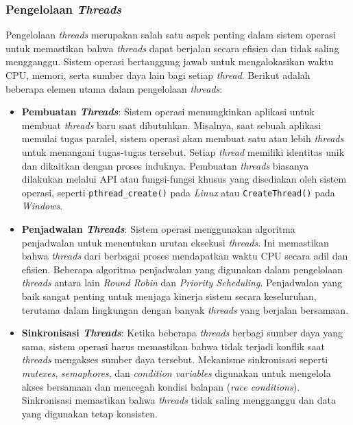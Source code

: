 \documentclass[12pt]{article}
\begin{document}
\begin{enumerate}
\end{enumerate}

\subsubsection{Pengelolaan \textit{Threads}}
Pengelolaan \textit{threads} merupakan salah satu aspek penting dalam sistem operasi untuk memastikan bahwa \textit{threads} dapat berjalan secara efisien dan tidak saling mengganggu. Sistem operasi bertanggung jawab untuk mengalokasikan waktu CPU, memori, serta sumber daya lain bagi setiap \textit{thread}. Berikut adalah beberapa elemen utama dalam pengelolaan \textit{threads}:

\begin{itemize}
    \item \textbf{Pembuatan \textit{Threads}}: Sistem operasi memungkinkan aplikasi untuk membuat \textit{threads} baru saat dibutuhkan. Misalnya, saat sebuah aplikasi memulai tugas paralel, sistem operasi akan membuat satu atau lebih \textit{threads} untuk menangani tugas-tugas tersebut. Setiap \textit{thread} memiliki identitas unik dan dikaitkan dengan proses induknya. Pembuatan \textit{threads} biasanya dilakukan melalui API atau fungsi-fungsi khusus yang disediakan oleh sistem operasi, seperti \texttt{pthread\_create()} pada \textit{Linux} atau \texttt{CreateThread()} pada \textit{Windows}.

    \item \textbf{Penjadwalan \textit{Threads}}: Sistem operasi menggunakan algoritma penjadwalan untuk menentukan urutan eksekusi \textit{threads}. Ini memastikan bahwa \textit{threads} dari berbagai proses mendapatkan waktu CPU secara adil dan efisien. Beberapa algoritma penjadwalan yang digunakan dalam pengelolaan \textit{threads} antara lain \textit{Round Robin} dan \textit{Priority Scheduling}. Penjadwalan yang baik sangat penting untuk menjaga kinerja sistem secara keseluruhan, terutama dalam lingkungan dengan banyak \textit{threads} yang berjalan bersamaan.

    \item \textbf{Sinkronisasi \textit{Threads}}: Ketika beberapa \textit{threads} berbagi sumber daya yang sama, sistem operasi harus memastikan bahwa tidak terjadi konflik saat \textit{threads} mengakses sumber daya tersebut. Mekanisme sinkronisasi seperti \textit{mutexes}, \textit{semaphores}, dan \textit{condition variables} digunakan untuk mengelola akses bersamaan dan mencegah kondisi balapan (\textit{race conditions}). Sinkronisasi memastikan bahwa \textit{threads} tidak saling mengganggu dan data yang digunakan tetap konsisten.


\end{itemize}
\end{document}

